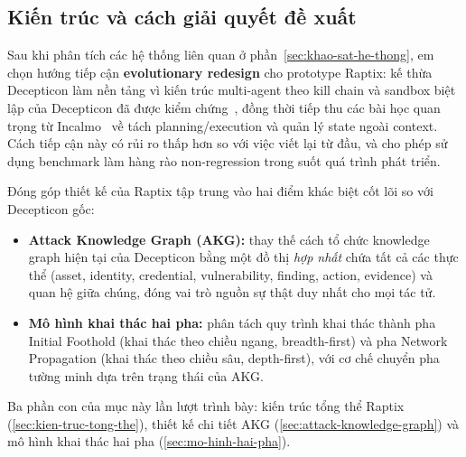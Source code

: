 
\subsection{Kiến trúc và cách giải quyết đề xuất}
\label{sec:kien-truc-de-xuat}

Sau khi phân tích các hệ thống liên quan ở phần~\ref{sec:khao-sat-he-thong}, em chọn hướng tiếp cận \textbf{evolutionary redesign} cho prototype Raptix: kế thừa Decepticon làm nền tảng vì kiến trúc multi-agent theo kill chain và sandbox biệt lập của Decepticon đã được kiểm chứng~\cite{decepticon}, đồng thời tiếp thu các bài học quan trọng từ Incalmo~\cite{incalmo} về tách planning/execution và quản lý state ngoài context. Cách tiếp cận này có rủi ro thấp hơn so với việc viết lại từ đầu, và cho phép sử dụng benchmark làm hàng rào non-regression trong suốt quá trình phát triển.

Đóng góp thiết kế của Raptix tập trung vào hai điểm khác biệt cốt lõi so với Decepticon gốc:

\begin{itemize}
    \item \textbf{Attack Knowledge Graph (AKG):} thay thế cách tổ chức knowledge graph hiện tại của Decepticon bằng một đồ thị \emph{hợp nhất} chứa tất cả các thực thể (asset, identity, credential, vulnerability, finding, action, evidence) và quan hệ giữa chúng, đóng vai trò nguồn sự thật duy nhất cho mọi tác tử.
    \item \textbf{Mô hình khai thác hai pha:} phân tách quy trình khai thác thành pha Initial Foothold (khai thác theo chiều ngang, breadth-first) và pha Network Propagation (khai thác theo chiều sâu, depth-first), với cơ chế chuyển pha tường minh dựa trên trạng thái của AKG.
\end{itemize}

Ba phần con của mục này lần lượt trình bày: kiến trúc tổng thể Raptix (\ref{sec:kien-truc-tong-the}), thiết kế chi tiết AKG (\ref{sec:attack-knowledge-graph}) và mô hình khai thác hai pha (\ref{sec:mo-hinh-hai-pha}).



